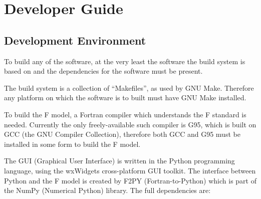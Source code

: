 \chapter{Developer Guide}









\section{Development Environment}
\label{dev:env}

To build any of the software, at the very least the software the build system is based on and the 
dependencies for the software must be present.

The build system is a collection of ``Makefiles'', as used by GNU Make.  Therefore any platform on 
which the software is to built must have GNU Make installed.

To build the F model, a Fortran compiler which understands the F standard is needed.  Currently the 
only freely-available such compiler is G95, which is built on GCC (the GNU Compiler Collection), 
therefore both GCC and G95 must be installed in some form to build the F model.

The GUI (Graphical User Interface) is written in the Python programming language, using the 
wxWidgets cross-platform GUI toolkit.  The interface between Python and the F model is created by 
F2PY (Fortran-to-Python) which is part of the NumPy (Numerical Python) library.  The full 
dependencies are:

